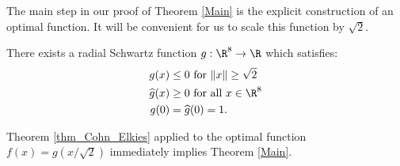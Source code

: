 The main step in our proof of Theorem \ref{Main} is the explicit  construction of an optimal function. It will be convenient for us to scale this function by $\sqrt{2}$.
\begin{theorem}\label{thm_g}
There exists a radial Schwartz function $g:\R^8\to\R$ which satisfies:
\begin{align}
g(x)&\leq 0\mbox{ for } \|x\|\geq \sqrt{2} \label{eqn_g1}\\
\widehat{g}(x)&\geq0\mbox{ for all } x\in\R^8\label{eqn_g2}\\
g(0)&=\widehat{g}(0)=1.\label{eqn_g3}
\end{align}
\end{theorem}
Theorem \ref{thm_Cohn_Elkies} applied to the optimal function $f(x)=g(x/\sqrt{2})$ immediately implies Theorem \ref{Main}.
